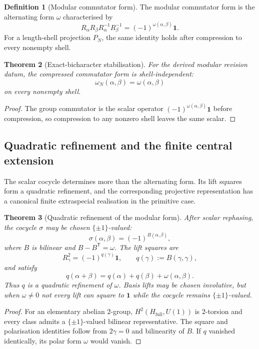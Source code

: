 \documentclass[11pt]{article}
\newtheorem{theorem}{Theorem}[section]
\theoremstyle{definition}
\newtheorem{definition}[theorem]{Definition}
\theoremstyle{remark}
\newcommand{\Hf}{H_{\mathrm{full}}}
\newcommand{\one}{\mathbf{1}}
\begin{document}
\begin{definition}[Modular commutator form]
\label{def:modular-form-main}
The modular commutator form is the alternating form \(\omega\) characterised by
\[
  R_\alpha R_\beta R_\alpha^{-1}R_\beta^{-1}
  =(-1)^{\omega(\alpha,\beta)}\one.
\]
For a length-shell projection \(P_N\), the same identity holds after compression
to every nonempty shell.
\end{definition}

\begin{theorem}[Exact-bicharacter stabilisation]
\label{thm:exact-bicharacter-stabilisation}
For the derived modular revision datum, the compressed commutator form is
shell-independent:
\[
  \omega_N(\alpha,\beta)=\omega(\alpha,\beta)
\]
on every nonempty shell.
\end{theorem}

\begin{proof}
The group commutator is the scalar operator
\((-1)^{\omega(\alpha,\beta)}\one\) before compression, so compression to any
nonzero shell leaves the same scalar.
\end{proof}

\subsection{Quadratic refinement and the finite central extension}
\label{subsec:revision-central-extension}

The scalar cocycle determines more than the alternating form.  Its lift squares
form a quadratic refinement, and the corresponding projective representation
has a canonical finite extraspecial realisation in the primitive case.

\begin{theorem}[Quadratic refinement of the modular form]
\label{thm:revision-quadratic-refinement-main}
After scalar rephasing, the cocycle $\sigma$ may be chosen $\{\pm1\}$-valued:
\[
  \sigma(\alpha,\beta)=(-1)^{B(\alpha,\beta)},
\]
where $B$ is bilinear and $B-B^{\mathsf T}=\omega$.  The lift squares are
\[
  R_\gamma^2=(-1)^{q(\gamma)}\one,
  \qquad q(\gamma):=B(\gamma,\gamma),
\]
and satisfy
\[
  q(\alpha+\beta)
  =q(\alpha)+q(\beta)+\omega(\alpha,\beta).
\]
Thus $q$ is a quadratic refinement of $\omega$.  Basis lifts may be chosen
involutive, but when $\omega\ne0$ not every lift can square to $\one$ while the
cocycle remains $\{\pm1\}$-valued.
\end{theorem}

\begin{proof}
For an elementary abelian $2$-group,
$H^2(\Hf,U(1))$ is $2$-torsion and every class admits a $\{\pm1\}$-valued
bilinear representative.  The square and polarisation identities follow from
$2\gamma=0$ and bilinearity of $B$.  If $q$ vanished identically, its polar form
$\omega$ would vanish.
\end{proof}
\end{document}
